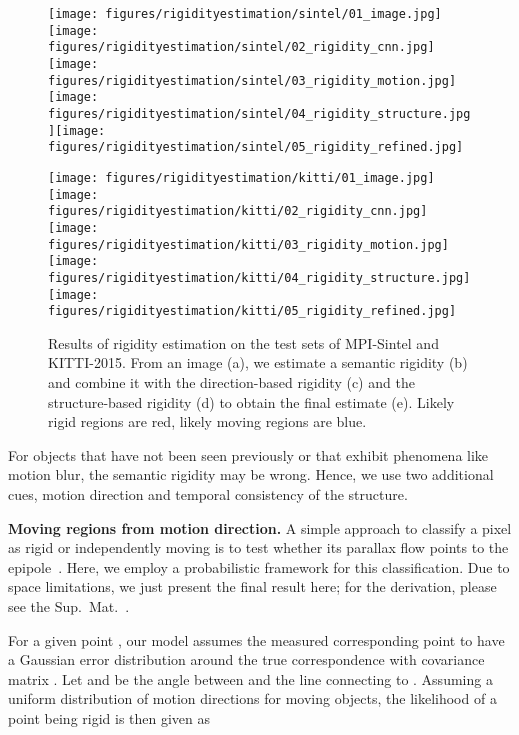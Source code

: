 \documentclass[10pt,twocolumn,letterpaper]{article}
\begin{document}
\newcommand{\rigidwidth}{0.2\textwidth}
\begin{figure*}[t]
\centerline{
	\texttt{[image: figures/rigidityestimation/sintel/01\_image.jpg]}\texttt{[image: figures/rigidityestimation/sintel/02\_rigidity\_cnn.jpg]}\texttt{[image: figures/rigidityestimation/sintel/03\_rigidity\_motion.jpg]}\texttt{[image: figures/rigidityestimation/sintel/04\_rigidity\_structure.jpg]}\texttt{[image: figures/rigidityestimation/sintel/05\_rigidity\_refined.jpg]}}
\centerline{
	\texttt{[image: figures/rigidityestimation/kitti/01\_image.jpg]}\texttt{[image: figures/rigidityestimation/kitti/02\_rigidity\_cnn.jpg]}\texttt{[image: figures/rigidityestimation/kitti/03\_rigidity\_motion.jpg]}\texttt{[image: figures/rigidityestimation/kitti/04\_rigidity\_structure.jpg]}\texttt{[image: figures/rigidityestimation/kitti/05\_rigidity\_refined.jpg]}}
\vspace{-0.07in}
\caption{Results of rigidity estimation on the test sets of MPI-Sintel and KITTI-2015. From an image (a), we estimate a semantic rigidity (b) and combine it with the direction-based rigidity (c) and the structure-based rigidity (d) to obtain the final estimate (e). Likely rigid regions are red, likely moving regions are blue.}
\label{fig:rigidity}
\end{figure*}
\noindent
For objects that have not been seen previously or that exhibit
phenomena like motion blur, the semantic rigidity may be wrong. 
Hence, we use two additional cues, motion direction and temporal consistency of the structure.

\noindent
{\bf Moving regions from motion direction.}
A simple approach to classify a pixel as rigid or independently moving is to test whether its parallax flow points to the epipole~\cite{Irani:1998:MovingObjectDetection}.
Here, we employ a probabilistic framework for this classification.
Due to space limitations, we just present the final result here; for the derivation, please see the Sup.~Mat.~\cite{MRFlow:Website}.



For a given point , our model assumes the measured corresponding point  to have a Gaussian error distribution around the true correspondence with covariance matrix .
Let  and  be the angle between  and the line connecting  to .
Assuming a uniform distribution of motion directions for moving objects, the likelihood of a point being rigid is then given as
\end{document}
